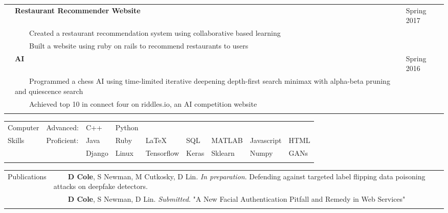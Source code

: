\documentclass[10.5pt, arial]{article}
\newcommand{\tabitem}{~~\llap{\textbullet}~~}
\begin{document}
\begin{tabular}{p{1.5cm} p{13.2cm} l}
                & \textbf{Restaurant Recommender Website}                       & Spring 2017             \\
                & \tabitem Created a restaurant recommendation system using collaborative based learning    &   \\
                & \tabitem Built a website using ruby on rails to recommend restaurants to users            &   \\

                & \textbf{AI}                                             & Spring 2016   \\
                & \tabitem Programmed a chess AI using time-limited iterative deepening depth-first search minimax with alpha-beta pruning and quiescence search & \\
                & \tabitem Achieved top 10 in connect four on riddles.io, an AI competition website & \\ 
\\
\end{tabular}


\begin{tabular}{p{1.5cm} l l l l l l l l}
Computer	& Advanced: 	
            & C++ 		& Python 	& 			& 			& 			& 				&       \\
Skills		& Proficient:	
            & Java 		& Ruby 		& \LaTeX 	& SQL 		& MATLAB   	& Javascript	& HTML  \\
			&			 	
            & Django 	& Linux 	& Tensorflow& Keras     & Sklearn	& Numpy	        & GANs  \\ \\ %
\end{tabular}


\begin{tabular}{p{1.5cm} p{16.5cm}}
    Publications    & \tabitem \textbf{D Cole}, S Newman, M Cutkosky, D Lin. \textit{In preparation}. Defending against targeted label flipping data poisoning attacks on deepfake detectors. \\
                    & \tabitem \textbf{D Cole}, S Newman, D Lin. \textit{Submitted}. "A New Facial Authentication Pitfall and Remedy in Web Services" \\ \\
\end{tabular}
\end{document}

